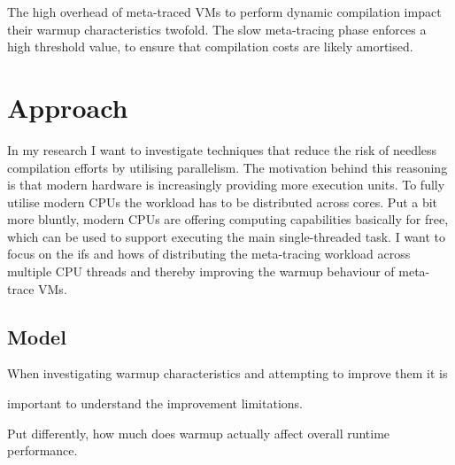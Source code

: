 The high overhead of meta-traced VMs to perform dynamic compilation impact their
warmup characteristics twofold. The slow meta-tracing phase enforces a high
threshold value, to ensure that compilation costs are likely amortised.









\section{Approach}

In my research I want to investigate techniques that reduce the risk of needless
compilation efforts by utilising parallelism. The motivation behind this
reasoning is that modern hardware is increasingly providing more execution
units. To fully utilise modern CPUs the workload has to be distributed across
cores. Put a bit more bluntly, modern CPUs are offering computing capabilities
basically for free, which can be used to support executing the main
single-threaded task. I want to focus on the ifs and hows of distributing the
meta-tracing workload across multiple CPU threads and thereby improving the
warmup behaviour of meta-trace VMs.

\subsection{Model}

When investigating warmup characteristics and attempting to improve them it is


important to understand the improvement limitations.



 Put differently, how much does warmup actually
affect overall runtime performance.


